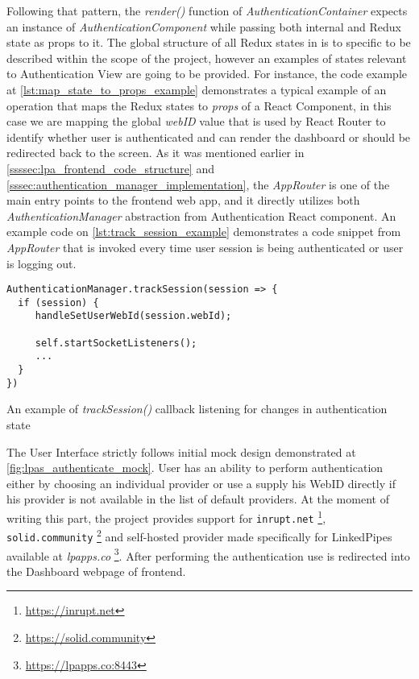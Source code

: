 Following that pattern, the \textit{render()} function of \textit{AuthenticationContainer} expects an instance of \textit{AuthenticationComponent} while passing both internal and Redux state as props to it. The global structure of all Redux states in \lpa{} is to specific to be described within the scope of the \lpas{} project, however an examples of states relevant to Authentication View are going to be provided. For instance, the code example at \autoref{lst:map_state_to_props_example} demonstrates a typical example of an operation that maps the Redux states to \textit{props} of a React Component, in this case we are mapping the global \textit{webID} value that is used by React Router to identify whether user is authenticated and can render the dashboard or should be redirected back to the screen. As it was mentioned earlier in \autoref{ssssec:lpa_frontend_code_structure} and \autoref{sssec:authentication_manager_implementation}, the \textit{AppRouter} is one of the main entry points to the frontend web app, and it directly utilizes both \textit{AuthenticationManager} abstraction from Authentication React component. An example code on \autoref{lst:track_session_example} demonstrates a code snippet from \textit{AppRouter} that is invoked every time user session is being authenticated or user is logging out.

\begin{listing}[H]    
\begin{verbatim}
AuthenticationManager.trackSession(session => {
  if (session) {
     handleSetUserWebId(session.webId);

     self.startSocketListeners();
     ...
  }
})
\end{verbatim}
\caption{An example of \textit{trackSession()} callback listening for changes in authentication state} 
\label{lst:track_session_example}
\end{listing}

The User Interface strictly follows initial mock design demonstrated at \autoref{fig:lpas_authenticate_mock}. User has an ability to perform authentication either by choosing an individual \solid{} provider or use a supply his WebID directly if his \solid{} provider is not available in the list of default providers. At the moment of writing this part, the project provides support for \texttt{inrupt.net} \footnote{\url{https://inrupt.net}}, \texttt{solid.community} \footnote{\url{https://solid.community}} and self-hosted provider made specifically for LinkedPipes available at \textit{lpapps.co} \footnote{\url{https://lpapps.co:8443}}. After performing the authentication use is redirected into the Dashboard webpage of \lpa{} frontend.

